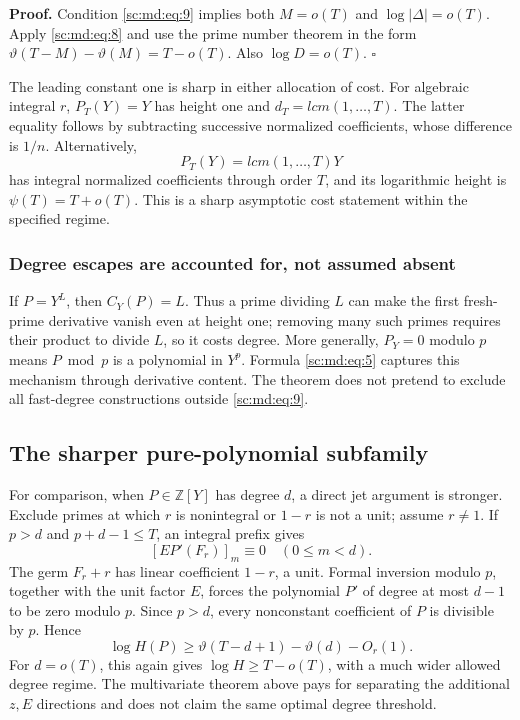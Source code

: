 \documentclass[11pt,a4paper]{article}
\theoremstyle{definition}
\theoremstyle{remark}
\theoremstyle{plain}
\numberwithin{equation}{section}
\def\operatorname#1{#1}\def\mathrm#1{#1}}
\begin{document}
\textbf{Proof.} Condition \eqref{sc:md:eq:9} implies both \(M=o(T)\) and
\(\log|\Delta|=o(T)\). Apply \eqref{sc:md:eq:8} and use the prime number theorem in the
form \(\vartheta(T-M)-\vartheta(M)=T-o(T)\). Also \(\log D=o(T)\).
\(\square\)

The leading constant one is sharp in either allocation of cost. For
algebraic integral \(r\), \(P_T(Y)=Y\) has height one and
\(d_T=\operatorname{lcm}(1,\ldots,T)\). The latter equality follows by
subtracting successive normalized coefficients, whose difference is
\(1/n\). Alternatively, \[
P_T(Y)=\operatorname{lcm}(1,\ldots,T)Y
\] has integral normalized coefficients through order \(T\), and its
logarithmic height is \(\psi(T)=T+o(T)\). This is a sharp asymptotic
cost statement within the specified regime.

\subsubsection{Degree escapes are accounted for, not assumed
absent}\label{sc:md:degree-escapes-are-accounted-for-not-assumed-absent}

If \(P=Y^L\), then \(C_Y(P)=L\). Thus a prime dividing \(L\) can make
the first fresh-prime derivative vanish even at height one; removing
many such primes requires their product to divide \(L\), so it costs
degree. More generally, \(P_Y=0\) modulo \(p\) means \(P\bmod p\) is a
polynomial in \(Y^p\). Formula \eqref{sc:md:eq:5} captures this mechanism through
derivative content. The theorem does not pretend to exclude all
fast-degree constructions outside \eqref{sc:md:eq:9}.

\subsection{The sharper pure-polynomial
subfamily}\label{sc:md:the-sharper-pure-polynomial-subfamily}

For comparison, when \(P\in\mathbb Z[Y]\) has degree \(d\), a direct jet
argument is stronger. Exclude primes at which \(r\) is nonintegral or
\(1-r\) is not a unit; assume \(r\ne1\). If \(p>d\) and \(p+d-1\le T\),
an integral prefix gives \[
[E P'(F_r)]_m\equiv0\quad(0\le m<d).
\] The germ \(F_r+r\) has linear coefficient \(1-r\), a unit. Formal
inversion modulo \(p\), together with the unit factor \(E\), forces the
polynomial \(P'\) of degree at most \(d-1\) to be zero modulo \(p\).
Since \(p>d\), every nonconstant coefficient of \(P\) is divisible by
\(p\). Hence \[
\log H(P)\ge\vartheta(T-d+1)-\vartheta(d)-O_r(1).
\] For \(d=o(T)\), this again gives \(\log H\ge T-o(T)\), with a much
wider allowed degree regime. The multivariate theorem above pays for
separating the additional \(z,E\) directions and does not claim the same
optimal degree threshold.
\end{document}
